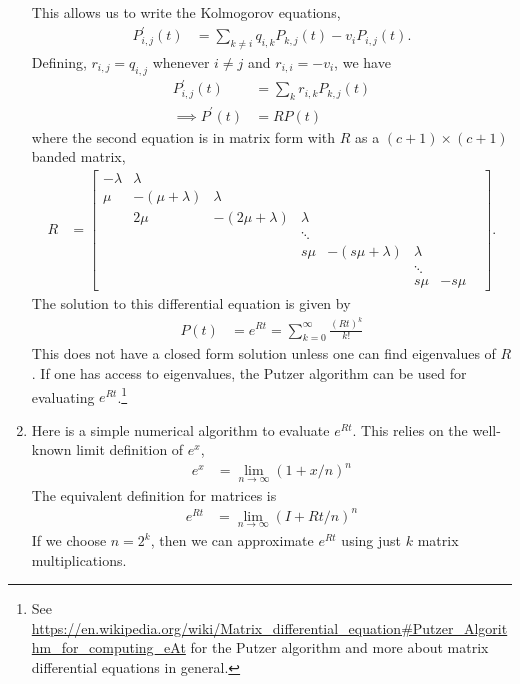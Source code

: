 \documentclass[11pt]{article}
\begin{document}
\begin{enumerate}
This allows us to write the Kolmogorov equations,
\begin{align*}
	P_{i,j}^{\prime}(t) &= \sum_{k \neq i} q_{i,k} P_{k, j}(t) - v_i P_{i, j}(t).
\end{align*}
Defining, $r_{i,j} = q_{i, j}$ whenever $i \neq j$ and $r_{i, i} = -v_i$, we have
\begin{align*}
	P_{i, j}^{\prime}(t) &= \sum_k r_{i, k} P_{k, j}(t) \\
	\implies P^{\prime}(t) &= R P(t)
\end{align*}
where the second equation is in matrix form with $R$ as a $(c+1) \times (c+1)$ banded matrix,
\begin{align*}
	R &= \begin{bmatrix}
	-\lambda & \lambda &  &  &  &  &  \\
	\mu & -(\mu + \lambda) & \lambda &  &  &  &  \\
	 & 2 \mu & - (2 \mu + \lambda) & \lambda &  &  &  \\
	 &  &  & \ddots &  & & \\
	 & & & s \mu & - (s \mu + \lambda) & \lambda & & \\
	 &  &  & &  & \ddots & \\
	 & & & & & s \mu & -s \mu
	\end{bmatrix}.
\end{align*}
The solution to this differential equation is given by
\begin{align*}
	P(t) &= e^{R t} = \sum_{k=0}^{\infty} \frac{(Rt)^k}{k!}
\end{align*}
This does not have a closed form solution unless one can find eigenvalues of $R$. If one has access to eigenvalues, the Putzer algorithm can be used for evaluating $e^{Rt}$.\footnote{See \url{https://en.wikipedia.org/wiki/Matrix_differential_equation\#Putzer\_Algorithm\_for\_computing\_eAt} for the Putzer algorithm and more about matrix differential equations in general.}

\item Here is a simple numerical algorithm to evaluate $e^{Rt}$. This relies on the well-known limit definition of $e^x$,
\begin{align*}
	e^x &= \lim_{n \to \infty} (1 + x / n)^n
\end{align*}
The equivalent definition for matrices is
\begin{align*}
	e^{Rt} &= \lim_{n \to \infty} (I + Rt / n)^n
\end{align*}
If we choose $n = 2^k$, then we can approximate $e^{Rt}$ using just $k$ matrix multiplications.


\end{enumerate}
\end{document}
